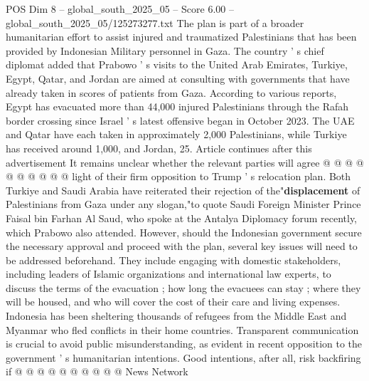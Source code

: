 \begin{textsample}{POS Dim 8 – global\_south\_2025\_05 – Score 6.00 – global\_south\_2025\_05/125273277.txt}
The plan is part of a broader humanitarian effort to assist injured and traumatized Palestinians that has been provided by Indonesian Military personnel in Gaza.
The country ' s chief diplomat added that Prabowo ' s visits to the United Arab Emirates, Turkiye, Egypt, Qatar, and Jordan are aimed at consulting with governments that have already taken in scores of patients from Gaza.
According to various reports, Egypt has evacuated more than 44,000 injured Palestinians through the Rafah border crossing since Israel ' s latest offensive began in October 2023.
The UAE and Qatar have each taken in approximately 2,000 Palestinians, while Turkiye has received around 1,000, and Jordan, 25.
Article continues after this advertisement It remains unclear whether the relevant parties will agree @ @ @ @ @ @ @ @ @ @ light of their firm opposition to Trump ' s relocation plan.
Both Turkiye and Saudi Arabia have reiterated their rejection of the"\textbf{displacement} of Palestinians from Gaza under any slogan,"to quote Saudi Foreign Minister Prince Faisal bin Farhan Al Saud, who spoke at the Antalya Diplomacy forum recently, which Prabowo also attended.
However, should the Indonesian government secure the necessary approval and proceed with the plan, several key issues will need to be addressed beforehand.
They include engaging with domestic stakeholders, including leaders of Islamic organizations and international law experts, to discuss the terms of the evacuation ; how long the evacuees can stay ; where they will be housed, and who will cover the cost of their care and living expenses.
Indonesia has been sheltering thousands of refugees from the Middle East and Myanmar who fled conflicts in their home countries.
Transparent communication is crucial to avoid public misunderstanding, as evident in recent opposition to the government ' s humanitarian intentions.
Good intentions, after all, risk backfiring if @ @ @ @ @ @ @ @ @ @ News Network

\end{textsample}

